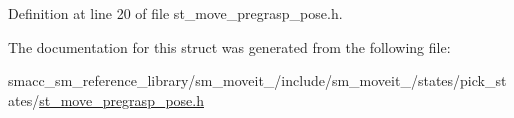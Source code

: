 Definition at line 20 of file st\+\_\+move\+\_\+pregrasp\+\_\+pose.\+h.



The documentation for this struct was generated from the following file\+:\begin{DoxyCompactItemize}
\item 
smacc\+\_\+sm\+\_\+reference\+\_\+library/sm\+\_\+moveit\+\_/include/sm\+\_\+moveit\+\_/states/pick\+\_\+states/\hyperlink{4_2include_2sm__moveit__4_2states_2pick__states_2st__move__pregrasp__pose_8h}{st\+\_\+move\+\_\+pregrasp\+\_\+pose.\+h}\end{DoxyCompactItemize}
